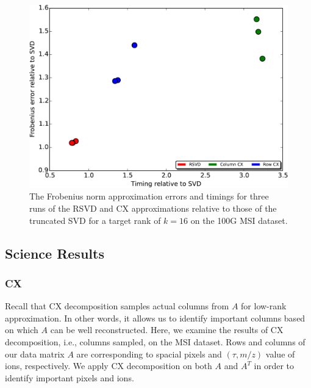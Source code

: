   \begin{figure}[h!btp]
    \begin{centering}
      \includegraphics[scale=0.4]{images/timing-accuracy-16}
      \end{centering}
      \caption{The Frobenius norm approximation errors and timings for three runs of the RSVD and CX approximations relative to those of the truncated SVD for a target rank of $k=16$ on the 100G MSI dataset.}
    \label{fig:timing-accuracy-16}
  \end{figure}

  \subsection{Science Results}
  \subsubsection{CX}
  Recall that CX decomposition samples actual columns from $A$ for low-rank approximation. In other words, it allows us to identify important columns based on which $A$ can be well reconstructed. Here, we examine the results of CX decomposition, i.e., columns sampled, on the MSI dataset.
 Rows and columns of our data matrix $A$ are corresponding to spacial pixels and $(\tau, m/z)$ value of ions, respectively. We apply CX decomposition on both $A$ and $A^T$ in order to identify important pixels and ions.
   
